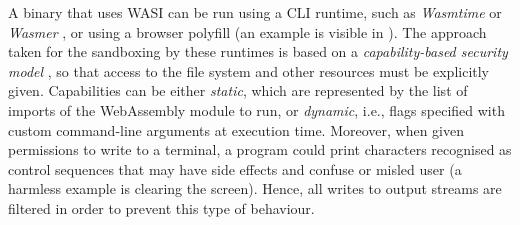 A binary that uses WASI can be run using a CLI runtime, such as \textit{Wasmtime} \cite{wasmtime} or \textit{Wasmer} \cite{wasmer},
or using a browser polyfill (an example is visible in \cite{wasi-polyfill}).
The approach taken for the sandboxing by these runtimes is based on a \textit{capability-based security model} \cite{wasmtime-security-sandboxing},
so that access to the file system and other resources must be explicitly given. Capabilities can be either \textit{static}, which
are represented by the list of imports of the WebAssembly module to run, or \textit{dynamic}, i.e., flags
specified with custom command-line arguments at execution time.
Moreover, when given permissions to write to a terminal, a program could print characters recognised as control
sequences that may have side effects and confuse or misled user (a harmless example is clearing the screen).
Hence, all writes to output streams are filtered in order to prevent this type of behaviour.

